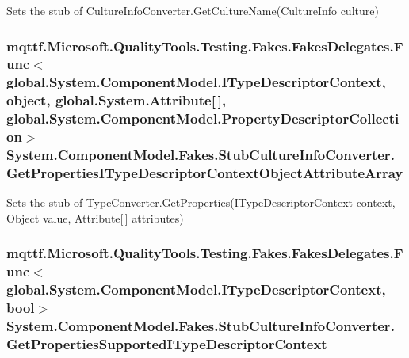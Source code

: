 Sets the stub of Culture\-Info\-Converter.\-Get\-Culture\-Name(\-Culture\-Info culture)

\hypertarget{class_system_1_1_component_model_1_1_fakes_1_1_stub_culture_info_converter_aca3ed5617c644058ae3344089a3e3bfa}{
\subsubsection[{Get\-Properties\-I\-Type\-Descriptor\-Context\-Object\-Attribute\-Array}]{\setlength{\rightskip}{0pt plus 5cm}mqttf.\-Microsoft.\-Quality\-Tools.\-Testing.\-Fakes.\-Fakes\-Delegates.\-Func$<$global.\-System.\-Component\-Model.\-I\-Type\-Descriptor\-Context, object, global.\-System.\-Attribute\mbox{[}$\,$\mbox{]}, global.\-System.\-Component\-Model.\-Property\-Descriptor\-Collection$>$ System.\-Component\-Model.\-Fakes.\-Stub\-Culture\-Info\-Converter.\-Get\-Properties\-I\-Type\-Descriptor\-Context\-Object\-Attribute\-Array}}\label{class_system_1_1_component_model_1_1_fakes_1_1_stub_culture_info_converter_aca3ed5617c644058ae3344089a3e3bfa}


Sets the stub of Type\-Converter.\-Get\-Properties(\-I\-Type\-Descriptor\-Context context, Object value, Attribute\mbox{[}$\,$\mbox{]} attributes)

\hypertarget{class_system_1_1_component_model_1_1_fakes_1_1_stub_culture_info_converter_a3cb2a37f01a624ea16e9e650d80ed8b0}{
\subsubsection[{Get\-Properties\-Supported\-I\-Type\-Descriptor\-Context}]{\setlength{\rightskip}{0pt plus 5cm}mqttf.\-Microsoft.\-Quality\-Tools.\-Testing.\-Fakes.\-Fakes\-Delegates.\-Func$<$global.\-System.\-Component\-Model.\-I\-Type\-Descriptor\-Context, bool$>$ System.\-Component\-Model.\-Fakes.\-Stub\-Culture\-Info\-Converter.\-Get\-Properties\-Supported\-I\-Type\-Descriptor\-Context}}\label{class_system_1_1_component_model_1_1_fakes_1_1_stub_culture_info_converter_a3cb2a37f01a624ea16e9e650d80ed8b0}


